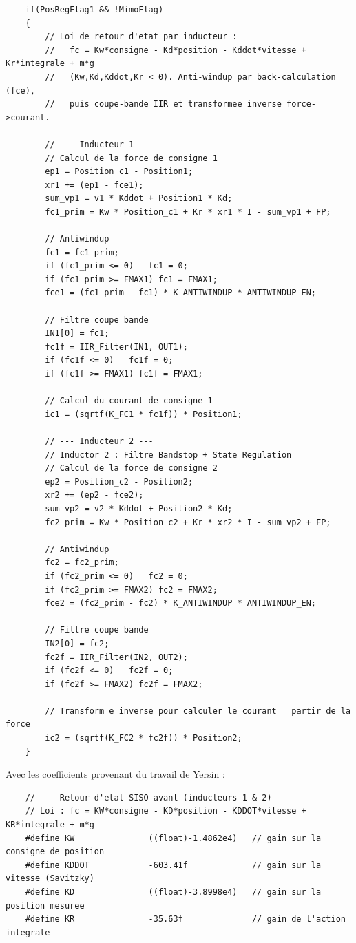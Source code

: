\begin{verbatim}
    if(PosRegFlag1 && !MimoFlag)
    {
        // Loi de retour d'etat par inducteur :
        //   fc = Kw*consigne - Kd*position - Kddot*vitesse + Kr*integrale + m*g
        //   (Kw,Kd,Kddot,Kr < 0). Anti-windup par back-calculation (fce),
        //   puis coupe-bande IIR et transformee inverse force->courant.

        // --- Inducteur 1 ---
        // Calcul de la force de consigne 1
        ep1 = Position_c1 - Position1;
        xr1 += (ep1 - fce1);
        sum_vp1 = v1 * Kddot + Position1 * Kd;
        fc1_prim = Kw * Position_c1 + Kr * xr1 * I - sum_vp1 + FP;

        // Antiwindup
        fc1 = fc1_prim;
        if (fc1_prim <= 0)   fc1 = 0;
        if (fc1_prim >= FMAX1) fc1 = FMAX1;
        fce1 = (fc1_prim - fc1) * K_ANTIWINDUP * ANTIWINDUP_EN;

        // Filtre coupe bande
        IN1[0] = fc1;
        fc1f = IIR_Filter(IN1, OUT1);
        if (fc1f <= 0)   fc1f = 0;
        if (fc1f >= FMAX1) fc1f = FMAX1;

        // Calcul du courant de consigne 1
        ic1 = (sqrtf(K_FC1 * fc1f)) * Position1;

        // --- Inducteur 2 ---
        // Inductor 2 : Filtre Bandstop + State Regulation
        // Calcul de la force de consigne 2
        ep2 = Position_c2 - Position2;
        xr2 += (ep2 - fce2);
        sum_vp2 = v2 * Kddot + Position2 * Kd;
        fc2_prim = Kw * Position_c2 + Kr * xr2 * I - sum_vp2 + FP;

        // Antiwindup
        fc2 = fc2_prim;
        if (fc2_prim <= 0)   fc2 = 0;
        if (fc2_prim >= FMAX2) fc2 = FMAX2;
        fce2 = (fc2_prim - fc2) * K_ANTIWINDUP * ANTIWINDUP_EN;

        // Filtre coupe bande
        IN2[0] = fc2;
        fc2f = IIR_Filter(IN2, OUT2);
        if (fc2f <= 0)   fc2f = 0;
        if (fc2f >= FMAX2) fc2f = FMAX2;

        // Transform e inverse pour calculer le courant   partir de la force
        ic2 = (sqrtf(K_FC2 * fc2f)) * Position2;
    }
\end{verbatim}

Avec les coefficients provenant du travail de Yersin \cite{Yersin} :

\begin{verbatim}
    // --- Retour d'etat SISO avant (inducteurs 1 & 2) ---
    // Loi : fc = KW*consigne - KD*position - KDDOT*vitesse + KR*integrale + m*g
    #define KW               ((float)-1.4862e4)   // gain sur la consigne de position
    #define KDDOT            -603.41f             // gain sur la vitesse (Savitzky)
    #define KD               ((float)-3.8998e4)   // gain sur la position mesuree
    #define KR               -35.63f              // gain de l'action integrale
\end{verbatim}

